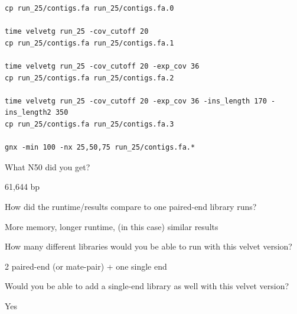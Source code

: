 \begin{steps}
\begin{lstlisting}
cp run_25/contigs.fa run_25/contigs.fa.0

time velvetg run_25 -cov_cutoff 20 
cp run_25/contigs.fa run_25/contigs.fa.1

time velvetg run_25 -cov_cutoff 20 -exp_cov 36 
cp run_25/contigs.fa run_25/contigs.fa.2

time velvetg run_25 -cov_cutoff 20 -exp_cov 36 -ins_length 170 -ins_length2 350
cp run_25/contigs.fa run_25/contigs.fa.3

gnx -min 100 -nx 25,50,75 run_25/contigs.fa.*
\end{lstlisting}

\end{steps}

\begin{questions}
What N50 did you get?
\begin{answer}
61,644 bp
\end{answer}

How did the runtime/results compare to one paired-end library runs?
\begin{answer}
More memory, longer runtime, (in this case) similar results
\end{answer}

How many different libraries would you be able to run with this velvet version?
\begin{answer}
2 paired-end (or mate-pair) + one single end
\end{answer}

Would you be able to add a single-end library as well with this velvet version?
\begin{answer}
Yes
\end{answer}
\end{questions}

